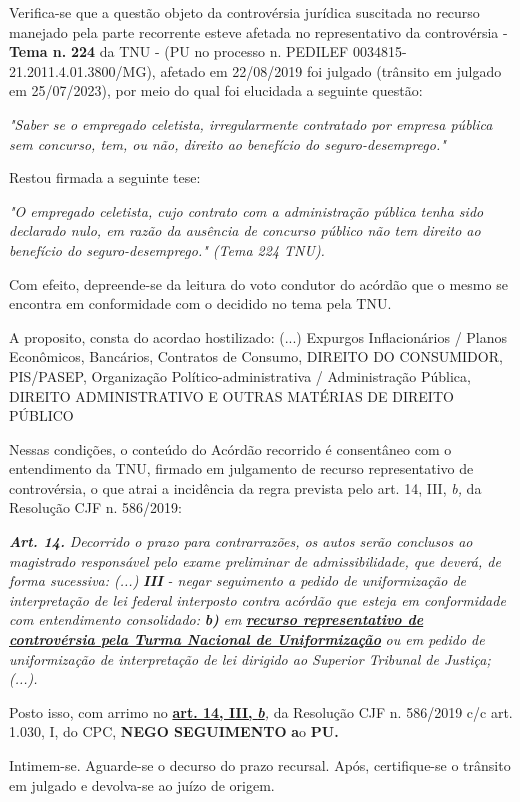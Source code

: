 \documentclass[12pt]{article}
\begin{document}
\justifying
\noindent Verifica-se que a questão objeto da controvérsia jurídica suscitada no recurso manejado pela parte recorrente esteve afetada no representativo da controvérsia - \textbf{Tema n. }\textbf{224} da TNU - (PU no processo n. PEDILEF 0034815-21.2011.4.01.3800/MG),  afetado em 22/08/2019 foi julgado (trânsito em julgado em 25/07/2023), por meio do qual foi elucidada a seguinte questão:

\noindent \textit{"Saber se o empregado celetista, irregularmente contratado por empresa pública sem concurso, tem, ou não, direito ao benefício do seguro-desemprego."}

\noindent Restou firmada a seguinte tese:

\noindent \textit{"O empregado celetista, cujo contrato com a administração pública tenha sido declarado nulo, em razão da ausência de concurso público não tem direito ao benefício do seguro-desemprego." (Tema 224 TNU).}

\noindent Com efeito, depreende-se da leitura do voto condutor do acórdão que o mesmo se encontra em conformidade com o decidido no  tema pela TNU.

\noindent A proposito, consta do acordao hostilizado: (...) Expurgos Inflacionários / Planos Econômicos, Bancários, Contratos de Consumo, DIREITO DO CONSUMIDOR, PIS/PASEP, Organização Político-administrativa / Administração Pública, DIREITO ADMINISTRATIVO E OUTRAS MATÉRIAS DE DIREITO PÚBLICO

\noindent Nessas condições, o conteúdo do Acórdão recorrido é consentâneo com o entendimento da TNU, firmado em julgamento de recurso representativo de controvérsia, o que atrai a incidência da regra prevista pelo art. 14, III, \textit{b,} da Resolução CJF n. 586/2019:

\noindent \textit{\textbf{Art. 14.}}\textit{ Decorrido o prazo para contrarrazões, os autos serão conclusos ao magistrado responsável pelo exame preliminar de admissibilidade, que deverá, de forma sucessiva: (...) }\textit{\textbf{III }}\textit{- negar seguimento a pedido de uniformização de interpretação de lei federal interposto contra acórdão que esteja em conformidade com entendimento consolidado: }\textit{\textbf{b)}}\textit{ em }\uline{\textit{\textbf{recurso representativo de controvérsia pela Turma Nacional de Uniformização}}}\textit{ ou em pedido de uniformização de interpretação de lei dirigido ao Superior Tribunal de Justiça;(...).}

\noindent Posto isso, com arrimo no \uline{\textbf{art. 14, III, }}\uline{\textit{\textbf{b}}}\textit{,} da Resolução CJF n. 586/2019 c/c art. 1.030, I, do CPC, \textbf{NEGO SEGUIMENTO }\textbf{a}o\textbf{ PU}\textbf{.}

\noindent Intimem-se. Aguarde-se o decurso do prazo recursal. Após, certifique-se o trânsito em julgado e devolva-se ao juízo de origem.
\end{document}
